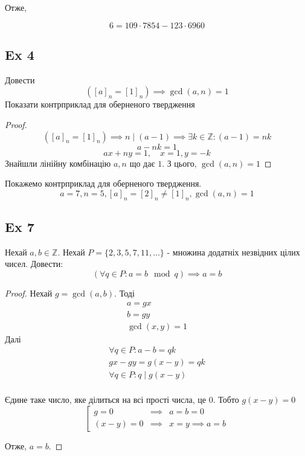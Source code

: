 \documentclass[11pt, a4paper]{article} %
\newcommand{\Z}{\mathbb{Z}}
\begin{document}
Отже,
\begin{mdframed}[style=yellow!20]
    $$6 = 109\cdot 7854 - 123 \cdot 6960$$
\end{mdframed}

\subsection*{Ex 4}
\begin{mdframed}
    Довести
    \[([a]_n = [1]_n) \implies \gcd(a,n)=1\]
    Показати контрприклад для оберненого твердження
\end{mdframed}

\begin{proof}
    $$([a]_n = [1]_n)  \implies n\mid (a-1) \implies \exists k\in\Z: (a-1)=nk$$
    $$a-nk=1$$
    $$ax+ny=1, \quad x=1, y=-k$$
    Знайшли лінійну комбінацію $a,n$ що дає $1$. З цього, $\gcd(a,n)=1$
\end{proof}
Покажемо контрприклад для оберненого твердження.
$$a = 7, n = 5, [a]_n = [2]_n\ne [1]_n, \gcd(a,n)=1$$


\subsection*{Ex 7}
\begin{mdframed}
    Нехай $a,b\in\Z$. Нехай $P=\{2,3,5,7,11,...\}$ - множина додатніх незвідних цілих чисел.
    Довести:
    \[\left(\forall q\in P: a = b \mod q\right) \implies a=b\]
\end{mdframed}

\begin{proof}
    Нехай $g = \gcd(a,b)$.
    Тоді 
    \begin{gather*}
        a = gx\\
        b = gy\\
        \gcd(x,y) = 1
    \end{gather*}
    Далі
    \begin{gather*}
        \forall q\in P: a-b = qk \\
        gx-gy = g(x-y) = qk \\
        \forall q\in P: q \mid g(x-y) \\
    \end{gather*}

    Єдине таке число, яке ділиться на всі прості числа, це $0$.
    Тобто $g(x-y) = 0$
    \[
    \left[\begin{matrix}
        g = 0 &\implies& a=b=0\\
        (x-y)=0 &\implies& x=y \implies a=b
    \end{matrix}\right.
    \]

    Отже, $a=b$.
\end{proof}
\end{document}
